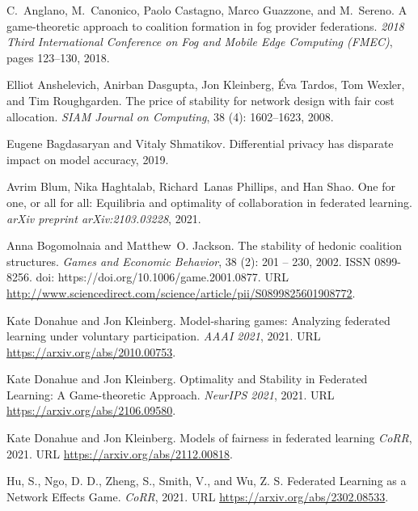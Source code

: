 \documentclass{article}
\newcommand{\doi}[1]{doi: #1}
\begin{document}
\begin{thebibliography}{23}

C.~Anglano, M.~Canonico, Paolo Castagno, Marco Guazzone, and M.~Sereno.
\newblock A game-theoretic approach to coalition formation in fog provider
  federations.
\newblock \emph{2018 Third International Conference on Fog and Mobile Edge
  Computing (FMEC)}, pages 123--130, 2018.

Elliot Anshelevich, Anirban Dasgupta, Jon Kleinberg, {\'E}va Tardos, Tom
  Wexler, and Tim Roughgarden.
\newblock The price of stability for network design with fair cost allocation.
\newblock \emph{SIAM Journal on Computing}, 38 (4):
  1602--1623, 2008.

Eugene Bagdasaryan and Vitaly Shmatikov.
\newblock Differential privacy has disparate impact on model accuracy, 2019.

Avrim Blum, Nika Haghtalab, Richard~Lanas Phillips, and Han Shao.
\newblock One for one, or all for all: Equilibria and optimality of
  collaboration in federated learning.
\newblock \emph{arXiv preprint arXiv:2103.03228}, 2021.

Anna Bogomolnaia and Matthew~O. Jackson.
\newblock The stability of hedonic coalition structures.
\newblock \emph{Games and Economic Behavior}, 38 (2): 201 --
  230, 2002.
\newblock ISSN 0899-8256.
\newblock \doi{https://doi.org/10.1006/game.2001.0877}.
\newblock URL
  \url{http://www.sciencedirect.com/science/article/pii/S0899825601908772}.

Kate Donahue and Jon Kleinberg.
\newblock Model-sharing games: Analyzing federated learning under voluntary
  participation.
\newblock \emph{AAAI 2021}, 2021.
\newblock URL \url{https://arxiv.org/abs/2010.00753}.

Kate Donahue and Jon Kleinberg.
\newblock Optimality and Stability in Federated Learning: A Game-theoretic Approach.
\newblock \emph{NeurIPS 2021}, 2021.
\newblock URL \url{https://arxiv.org/abs/2106.09580}.

Kate Donahue and Jon Kleinberg.
\newblock Models of fairness in federated learning
\newblock \emph{CoRR}, 2021.
\newblock URL \url{https://arxiv.org/abs/2112.00818}.

Hu, S., Ngo, D. D., Zheng, S., Smith, V., and Wu, Z. S.
\newblock Federated Learning as a Network Effects Game.
\newblock \emph{CoRR}, 2021.
\newblock URL \url{https://arxiv.org/abs/2302.08533}.


\end{thebibliography}
\end{document}
